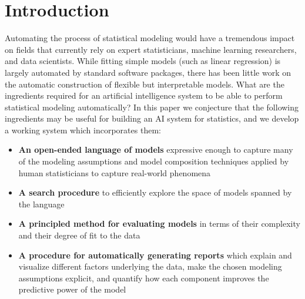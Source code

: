\documentclass[letterpaper]{article}
\begin{document}
\allowdisplaybreaks

\section{Introduction}

Automating the process of statistical modeling would have a tremendous impact on fields that currently rely on expert statisticians, machine learning researchers, and data scientists.
While fitting simple models (such as linear regression) is largely automated by standard software packages, there has been little work on the automatic construction of flexible but interpretable models. 
What are the ingredients required for an artificial intelligence system to be able to perform statistical modeling automatically? 
In this paper we conjecture that the following ingredients may be useful for building an AI system for statistics, and we develop a working system which incorporates them:
\begin{itemize}
\item {\bf An open-ended language of models} expressive enough to
  capture many of the modeling assumptions and model composition
  techniques  applied by human statisticians to capture real-world phenomena
\item {\bf A search procedure} to efficiently explore the space of
  models spanned by the language
\item {\bf A principled method for evaluating models} in terms of their complexity and their degree of fit to the
  data
\item {\bf A procedure for automatically generating reports} which
  explain and visualize different factors underlying the data, make
  the chosen modeling assumptions explicit, and quantify how each
  component improves the predictive power of the model 
\end{itemize}
\end{document}
